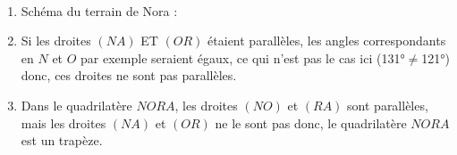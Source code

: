 \begin{corrige}
 \ \\ [-5mm]
    \begin{enumerate}
      \item Schéma du terrain de Nora : \par
      \item Si les droites $(NA)$ ET $(OR)$ étaient parallèles, les angles correspondants en $N$ et $O$ par exemple seraient égaux, ce qui n'est pas le cas ici (\ang{131}$\neq$\ang{121}) donc, {\red ces droites ne sont pas parallèles}.
      \item Dans le quadrilatère $NORA$, les droites $(NO)$ et $(RA)$ sont parallèles, mais les droites $(NA)$ et $(OR)$ ne le sont pas donc, {\red le quadrilatère $NORA$ est un trapèze}.   
   \end{enumerate}
\end{corrige}